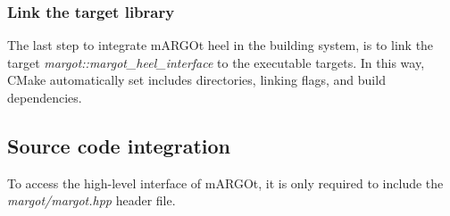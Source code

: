 \subsubsection{Link the target library}

The last step to integrate mARGOt heel in the building system, is to link the target \textit{margot::margot\_heel\_interface} to the executable targets.
In this way, CMake automatically set includes directories, linking flags, and build dependencies.


\subsection{Source code integration}

To access the high-level interface of mARGOt, it is only required to include the \textit{margot/margot.hpp} header file.